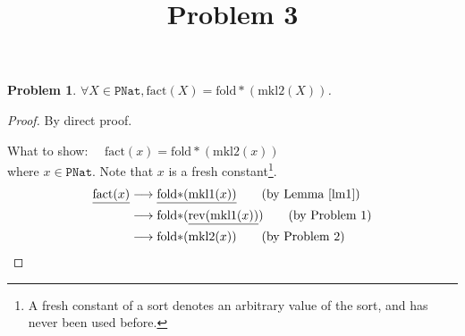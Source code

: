 \documentclass[12pt, a4paper]{article}
\title{Problem 3}
\date{\vspace{-5ex}}
\newtheorem{problem}{Problem}
\newcommand{\rmx}[1]{\mathrm{#1}}
\newcommand{\larrow}{\longrightarrow}
\newcommand{\under}{\underline}
\begin{document}
\maketitle

\begin{problem}
$\forall X \in \mathtt{PNat}, \rmx{fact}(X) = \rmx{fold*}(\rmx{mkl2}(X))$.
\end{problem}
\begin{proof}
By direct proof.

\noindent
What to show: $\quad\rmx{fact}(x) = \rmx{fold*}(\rmx{mkl2}(x))$ \\
where $x \in \mathtt{PNat}$. Note that $x$ is a fresh constant\footnote{A fresh constant of a sort denotes an arbitrary value of the sort, and has never been used before.}.
\begin{align*}
\under{\rmx{fact}(x)}
	&\larrow \under{\rmx{fold*}(\rmx{mkl1}(x))} \tag{by Lemma~\ref{lm1}} \\
	&\larrow \rmx{fold*}(\under{\rmx{rev}(\rmx{mkl1}(x))}) \tag{by Problem 1} \\
	&\larrow \rmx{fold*}(\rmx{mkl2}(x)) \tag{by Problem 2}
\end{align*}
\end{proof}
\end{document}
